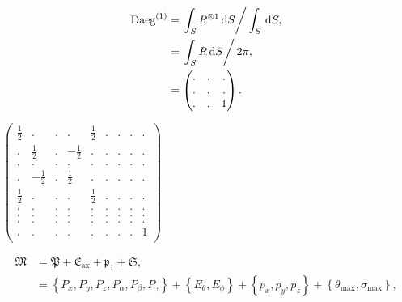 \documentclass[a4paper,11pt,twoside,openright]{book}
\def\lthtmlcheckvsize{\ifdim\ht\sizebox<\vsize 
  \ifdim\wd\sizebox<\hsize\expandafter\hfill\fi \expandafter\vfill
  \else\expandafter\vss\fi}%
\begin{document}
{\newpage\clearpage
\setcounter{equation}{18}
%
\begin{subequations}\begin{align}
\textrm{Daeg}^{(1)}&= \left. \int_S R^{\otimes 1} \,\mathrm{d}S \right / \int_S \,\mathrm{d}S, \\
&= \left. \int_S R \,\mathrm{d}S \right / 2\pi, \\
&= \begin{pmatrix}
. & . & . \\
. & . & . \\
. & . & 1 \\
\end{pmatrix} .
\end{align}\end{subequations}%
\lthtmldisplayZ
\lthtmlcheckvsize\clearpage}

{\newpage\clearpage
{}%
$\displaystyle \begin{pmatrix}
\tfrac{1}{2}& .      & . & .      & \tfrac{1}{2}& . & . & . & . \\
.     & \tfrac{1}{2}& . & -\tfrac{1}{2}& .     & . & . & . & . \\
.     & .      & . & .      & .     & . & . & . & . \\
.     & -\tfrac{1}{2}& . & \tfrac{1}{2}& .     & . & . & . & . \\
\tfrac{1}{2}& .      & . & .      & \tfrac{1}{2}& . & . & . & . \\
.     & .      & . & .      & .     & . & . & . & . \\
.     & .      & . & .      & .     & . & . & . & . \\
.     & .      & . & .      & .     & . & . & . & . \\
.     & .      & . & .      & .     & . & . & . & 1 \\
\end{pmatrix}$%
\lthtmlindisplaymathZ
\lthtmlcheckvsize\clearpage}

{\newpage\clearpage
\setcounter{equation}{21}
%
\begin{subequations}\begin{align}
\mathfrak{M}&= \mathfrak{P}+ \mathfrak{E}_{\textrm{ax}}+ \mathfrak{p}_1+ \mathfrak{S}, \\
&= \left\{ P_x, P_y, P_z, P_\alpha , P_\beta , P_\gamma \right\}+ \left\{ E_\theta , E_\phi \right\}+ \left\{ p_x, p_y, p_z\right\}+ \left\{ \theta_{\textrm{max}}, \sigma_{\textrm{max}}\right\} ,
\end{align}\end{subequations}%
\lthtmldisplayZ
\lthtmlcheckvsize\clearpage}
\end{document}
